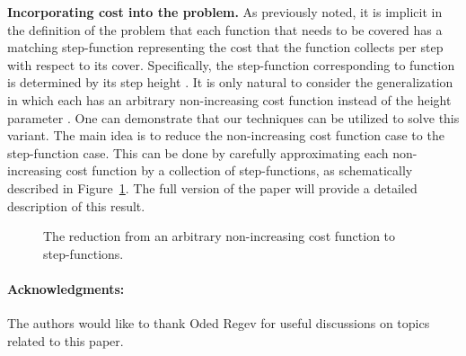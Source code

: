 \documentclass[11pt]{article}
\theoremstyle{plain}
\theoremstyle{definition}
\begin{document}
{\bf Incorporating cost into the problem.} As previously noted, it
is implicit in the definition of the problem that each function
that needs to be covered has a matching step-function representing
the cost that the function collects per step with respect to its
cover. Specifically, the step-function corresponding to function
 is determined by its step height . It is only natural
to consider the generalization in which each  has an
arbitrary non-increasing cost function  instead of the height parameter . One can
demonstrate that our techniques can be utilized to solve this
variant. The main idea is to reduce the non-increasing cost
function case to the step-function case. This can be done by
carefully approximating each non-increasing cost function by a
collection of step-functions, as schematically described in
Figure~\ref{fig:CostfuncGeneral}. The full version of the paper
will provide a detailed description of this result.

\begin{figure}[!hbt]
\centerline{  }
\caption{The reduction from an arbitrary non-increasing cost
function to step-functions.} \label{fig:CostfuncGeneral}
\end{figure}


\paragraph{Acknowledgments:}
The authors would like to thank Oded Regev for useful discussions
on topics related to this paper.
\end{document}

